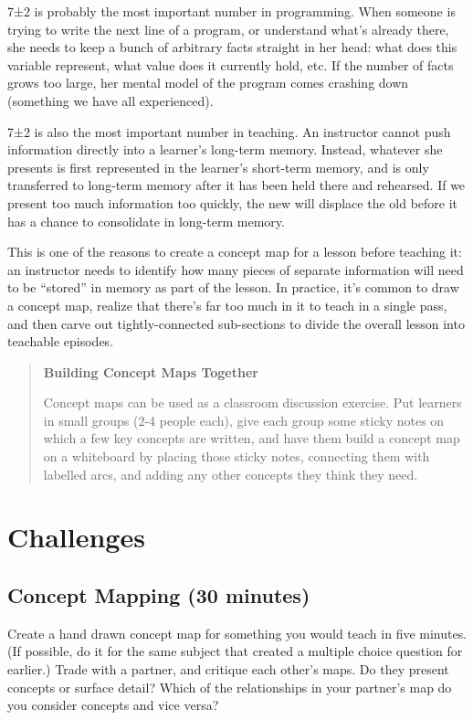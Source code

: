 \documentclass[10pt,statementpaper]{memoir}
\begin{document}
7±2 is probably the most important number in programming. When someone
is trying to write the next line of a program, or understand what's
already there, she needs to keep a bunch of arbitrary facts straight in
her head: what does this variable represent, what value does it
currently hold, etc. If the number of facts grows too large, her mental
model of the program comes crashing down (something we have all
experienced).

7±2 is also the most important number in teaching. An instructor cannot
push information directly into a learner's long-term memory. Instead,
whatever she presents is first represented in the learner's short-term
memory, and is only transferred to long-term memory after it has been
held there and rehearsed. If we present too much information too
quickly, the new will displace the old before it has a chance to
consolidate in long-term memory.

This is one of the reasons to create a concept map for a lesson before
teaching it: an instructor needs to identify how many pieces of separate
information will need to be ``stored'' in memory as part of the lesson.
In practice, it's common to draw a concept map, realize that there's far
too much in it to teach in a single pass, and then carve out
tightly-connected sub-sections to divide the overall lesson into
teachable episodes.

\begin{quote}
\textbf{Building Concept Maps Together}

Concept maps can be used as a classroom discussion exercise. Put
learners in small groups (2-4 people each), give each group some sticky
notes on which a few key concepts are written, and have them build a
concept map on a whiteboard by placing those sticky notes, connecting
them with labelled arcs, and adding any other concepts they think they
need.
\end{quote}

\section{Challenges}\label{challenges-3}

\subsection{Concept Mapping (30
minutes)}\label{concept-mapping-30-minutes}

Create a hand drawn concept map for something you would teach in five
minutes. (If possible, do it for the same subject that created a
multiple choice question for earlier.) Trade with a partner, and
critique each other's maps. Do they present concepts or surface detail?
Which of the relationships in your partner's map do you consider
concepts and vice versa?
\end{document}
